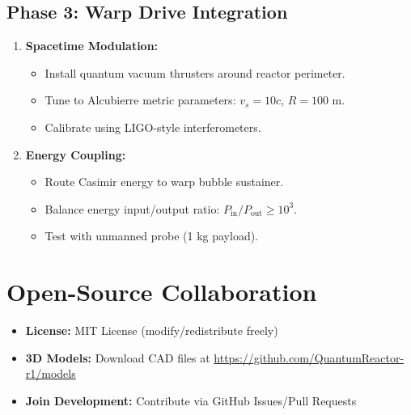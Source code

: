 \documentclass[12pt, a4paper]{article}
\begin{document}
\subsection{Phase 3: Warp Drive Integration}
\begin{enumerate}[leftmargin=*, start=5]
\item \textbf{Spacetime Modulation:}
\begin{itemize}
\item Install quantum vacuum thrusters around reactor perimeter.
\item Tune to Alcubierre metric parameters: \(v_s = 10c\), \(R = 100\) m.
\item Calibrate using LIGO-style interferometers.
\end{itemize}

\item \textbf{Energy Coupling:}
\begin{itemize}
\item Route Casimir energy to warp bubble sustainer.
\item Balance energy input/output ratio: \(P_{\text{in}}/P_{\text{out}} \geq 10^3\).
\item Test with unmanned probe (1 kg payload).
\end{itemize}
\end{enumerate}

\section{Open-Source Collaboration}
\begin{itemize}
\item \textbf{License:} MIT License (modify/redistribute freely)
\item \textbf{3D Models:} Download CAD files at \url{https://github.com/QuantumReactor-r1/models}
\item \textbf{Join Development:} Contribute via GitHub Issues/Pull Requests
\end{itemize}
\end{document}
